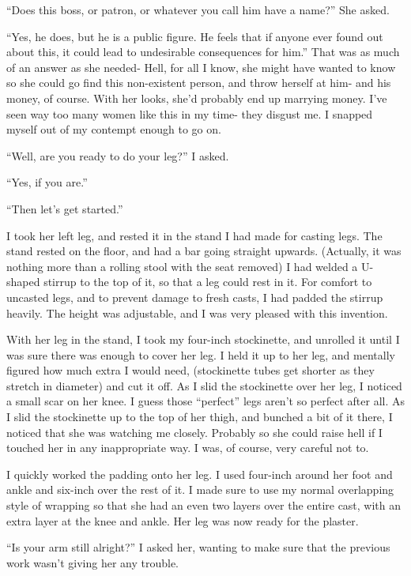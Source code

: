     ``Does this boss, or patron, or whatever you call him have a name?'' She asked.

    ``Yes, he does, but he is a public figure. He feels that if anyone ever found out about
this, it could lead to undesirable consequences for him.'' That was as much of an answer as she
needed- Hell, for all I know, she might have wanted to know so she could go find this
non-existent person, and throw herself at him- and his money, of course. With her looks, she'd
probably end up marrying money. I've seen way too many women like this in my time- they disgust
me. I snapped myself out of my contempt enough to go on.

    ``Well, are you ready to do your leg?'' I asked.

    ``Yes, if you are.''

    ``Then let's get started.''

    I took her left leg, and rested it in the stand I had made for casting legs. The stand
rested on the floor, and had a bar going straight upwards. (Actually, it was nothing more than a
rolling stool with the seat removed) I had welded a U-shaped stirrup to the top of it, so that a
leg could rest in it. For comfort to uncasted legs, and to prevent damage to fresh casts, I had
padded the stirrup heavily. The height was adjustable, and I was very pleased with this
invention.

    With her leg in the stand, I took my four-inch stockinette, and unrolled it until I was sure
there was enough to cover her leg. I held it up to her leg, and mentally figured how much extra
I would need, (stockinette tubes get shorter as they stretch in diameter) and cut it off. As I
slid the stockinette over her leg, I noticed a small scar on her knee. I guess those ``perfect''
legs aren't so perfect after all. As I slid the stockinette up to the top of her thigh, and
bunched a bit of it there, I noticed that she was watching me closely. Probably so she could
raise hell if I touched her in any inappropriate way. I was, of course, very careful not to.

    I quickly worked the padding onto her leg. I used four-inch around her foot and ankle and
six-inch over the rest of it. I made sure to use my normal overlapping style of wrapping so that
she had an even two layers over the entire cast, with an extra layer at the knee and ankle. Her
leg was now ready for the plaster.

    ``Is your arm still alright?'' I asked her, wanting to make sure that the previous work
wasn't giving her any trouble.

